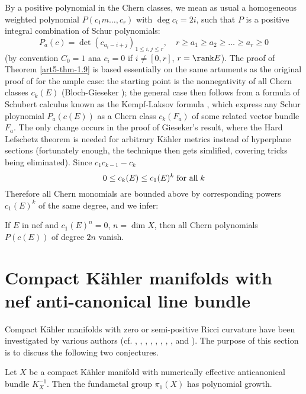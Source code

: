 By a positive polynomial in the Chern classes, we mean as usual a homogeneous weighted polynomial $P(c_{1}m \ldots, c_{r})$ with $\deg c_{i}= 2i$, such that $P$ is a positive integral combination of Schur polynomials:
$$
P_{a}(c)= \det (c_{a_{i}-i+j})_{1\leq i, j\leq r}, \quad r \geq a_{1} \geq a_{2} \geq \ldots \geq a_{r} \geq 0
$$
(by convention $C_{0}=1$ ana $c_{i} = 0$ if $i \neq [0,r]$, $r= \rank E$). The proof of Theorem \ref{art5-thm-1.9} is based essentially on the same artuments as the original proof of \cite{art5-keyFL83} for the ample case: the starting point is the nonnegativity of all Chern classes $c_{k}(E)$ (Bloch-Gieseker \cite{art5-keyBG71}); the general case then
follows from a formula of Schubert calculus known as the Kempf-Laksov formula \cite{art5-keyKL74}, which express any Schur ploynomial $P_{a}(c(E))$ as a Chern class $c_{k}(F_{a})$ of some related vector bundle $F_{a}$. The only change occurs in the proof of Gieseker's result, where the Hard Lefschetz theorem is needed for arbitrary K\"ahler metrics instead of hyperplane sections (fortunately enough, the technique then gets simlified, covering tricks being eliminated). Since $c_{1}c_{k-1}-c_{k}$
$$
0 \leq c_{k}(E) \leq c_{1} (E)^{k} \;\text{\rm for all}\; k
$$
Therefore all Chern monomials are bounded above by corresponding powers $c_{1}(E)^{k}$ of the same degree, and we infer:

\begin{coro}\label{art5-coro-1.10}
If $E$ in nef and $c_{1}(E)^{n} =0$, $n= \dim X$, then all Chern polynomials $P(c(E))$ of degree $2n$ vanish.
\end{coro}

\section{Compact K\"ahler manifolds with nef anti-canoni\-cal line bundle}\label{art5-sec-2}

 Compact K\"ahler manifolds with zero or semi-positive Ricci curvature have been investigated by various authors (cf. \cite{art5-keyCa57}, \cite{art5-keyKo61}, \cite{art5-keyLi67}, \cite{art5-keyLi71}, \cite{art5-keyLi72},
  \cite{art5-keyBo74a}, \cite{art5-keyBo74b}, \cite{art5-keyBe83}, \cite{art5-keyKo81} and \cite{art5-keyKr86}). The purpose of this section is to discuss the following two conjectures.

\begin{conjecture}\label{art5-conje-2.1}
Let $X$ be a compact K\"ahler manifold with numerically effective anticanonical bundle $K_{X}^{-1}$. Then the fundametal group $\pi_{1}(X)$ has polynomial growth.
\end{conjecture}

